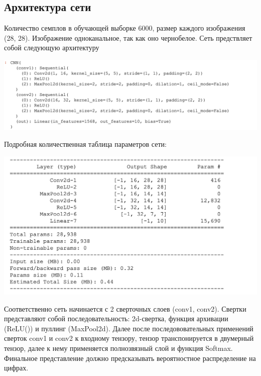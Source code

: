 \subsection{Архитектура сети}
Количество семплов в обучающей выборке 6000, размер каждого изображения (28, 28). Изображение одноканальное, так как оно чернобелое. Сеть предствляет собой следующую архитектуру
\begin{center}
    \includegraphics[scale=0.7]{images/CNN_arciticture.png}
\end{center}
Подробная количественная таблица параметров сети:
\begin{center}
    \includegraphics[scale=0.7]{images/cnn_params.png}
\end{center}
Соответственно сеть начинается с  2 сверточных слоев (conv1, conv2). Свертки представляют собой последовательность: 2d-свертка, функция архивации (ReLU()) и пуллинг (MaxPool2d). Далее после последововательных применений сверток conv1 и conv2 к входному тензору, тензор транспонируется в двумерный тензор, далее к нему применяется полнозвязный слой и функция Softmax. Финальное представление должно предсказывать вероятностное распределение на цифрах. \\
